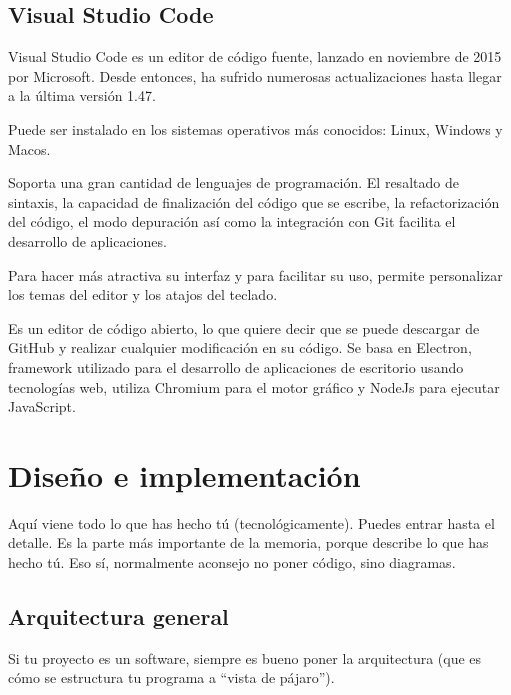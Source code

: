 \documentclass[a4paper, 12pt]{book}
\begin{document}
\section{Visual Studio Code} 
\label{sec:Visual Studio Code}

Visual Studio Code es un editor de código fuente, lanzado en noviembre de 2015 por Microsoft. Desde entonces, ha sufrido numerosas actualizaciones hasta llegar a la última versión 1.47. 

Puede ser instalado en los sistemas operativos más conocidos: Linux, Windows y Macos. 

Soporta una gran cantidad de lenguajes de programación. El resaltado de sintaxis, la capacidad de finalización del código que se escribe, la refactorización del código, el modo depuración así como la integración con Git facilita el desarrollo de aplicaciones. 

Para hacer más atractiva su interfaz y para facilitar su uso, permite personalizar los temas del editor y los atajos del teclado. 

Es un editor de código abierto, lo que quiere decir que se puede descargar de GitHub y realizar cualquier modificación en su código. Se basa en Electron, framework utilizado para el desarrollo de aplicaciones de escritorio usando tecnologías web, utiliza Chromium para el motor gráfico y NodeJs para ejecutar JavaScript.

\cleardoublepage
\chapter{Diseño e implementación}

Aquí viene todo lo que has hecho tú (tecnológicamente). 
Puedes entrar hasta el detalle. 
Es la parte más importante de la memoria, porque describe lo que has hecho tú.
Eso sí, normalmente aconsejo no poner código, sino diagramas.

\section{Arquitectura general} 
\label{sec:arquitectura}

Si tu proyecto es un software, siempre es bueno poner la arquitectura (que es cómo se estructura tu programa a ``vista de pájaro'').
\end{document}
